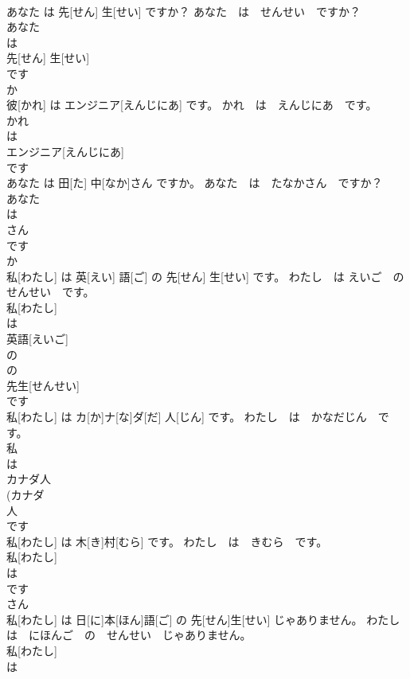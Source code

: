\documentclass[8pt]{extreport}
\begin{document}
\begin{CJK}{UTF8}{min}
\\	あなた は 先[せん] 生[せい] ですか？	あなた　は　せんせい　ですか？	
\\	あなた 
\\	は 
\\	先[せん] 生[せい] 
\\	です 
\\	か 
\\	彼[かれ] は エンジニア[えんじにあ] です。	かれ　は　えんじにあ　です。	
\\	かれ 
\\	は 
\\	エンジニア[えんじにあ] 
\\	です 
\\	あなた は 田[た] 中[なか]さん ですか。	あなた　は　たなかさん　ですか？	
\\	あなた 
\\	は 
\\	さん 
\\	です 
\\	か 
\\	私[わたし] は 英[えい] 語[ご] の 先[せん] 生[せい] です。	わたし　は えいご　の　せんせい　です。	
\\	私[わたし] 
\\	は 
\\	英語[えいご] 
\\	の 
\\	の
\\	先生[せんせい] 
\\	です 
\\	私[わたし] は カ[か]ナ[な]ダ[だ] 人[じん] です。	わたし　は　かなだじん　です。	
\\	私 
\\	は 
\\	カナダ人 
\\	(カナダ 
\\	人 
\\	です 
\\	私[わたし] は 木[き]村[むら] です。	わたし　は　きむら　です。	
\\	私[わたし] 
\\	は 
\\	です 
\\	さん 
\\	私[わたし] は 日[に]本[ほん]語[ご] の 先[せん]生[せい] じゃありません。	わたし　は　にほんご　の　せんせい　じゃありません。	
\\	私[わたし] 
\\	は 

\end{CJK}
\end{document}
